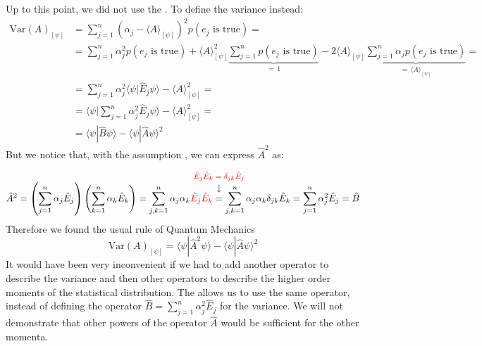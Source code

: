 \documentclass[../main.tex]{subfiles}
\begin{document}
Up to this point, we did not use the . To define the variance instead:
\begin{align*}
    \textrm{Var}(A)_{[\psi]}
    &=\sum_{j=1}^n\left(\alpha_j-\langle A \rangle_{[\psi]}\right)^2p(e_j \mbox{ is true})=\\
    &=\sum_{j=1}^n\alpha_j^2p(e_j \mbox{ is true})+\langle A \rangle_{[\psi]}^2\underbrace{\sum_{j=1}^n p(e_j \mbox{ is true})}_{=\,1}-2\langle A \rangle_{[\psi]}\underbrace{\sum_{j=1}^n\alpha_jp(e_j \mbox{ is true})}_{= \,\langle A \rangle_{[\psi]}}=\\
    &=\sum_{j=1}^n\alpha_j^2\langle \psi|\hat{E}_j \psi \rangle - \langle A \rangle_{[\psi]}^2=\\
    &=\langle \psi|\sum_{j=1}^n\alpha_j^2\hat{E}_j \psi \rangle - \langle A \rangle_{[\psi]}^2=\\
    &=\langle \psi|\hat{B} \psi \rangle - \langle \psi|\hat{A} \psi \rangle^2
\end{align*}
But we notice that, with the assumption , we can express $\hat{A}^2$ as:
\begin{align*}
    \hat{A}^2
    =\left(\sum_{j=1}^n \alpha_j \hat{E}_j \right)\left(\sum_{k=1}^n \alpha_k \hat{E}_k \right)
    =\sum_{j,k=1}^n\alpha_j\alpha_k {\color{red} \hat{E}_j\hat{E}_k}\overset{\mathclap{\tikz \node {↓} node [above=1ex] {\footnotesize \color{red} $\hat{E}_j\hat{E}_k=\delta_{jk}\hat{E}_j$};}}{=}
    \sum_{j,k=1}^n\alpha_j\alpha_k\delta_{jk}\hat{E}_k
    =\sum_{j=1}^n\alpha_j^2 \hat{E}_j
    =\hat{B}
\end{align*}
Therefore we found the usual rule of Quantum Mechanics
\[
\textrm{Var}(A)_{[\psi]}= \langle \psi|\hat{A}^2 \psi \rangle - \langle \psi|\hat{A} \psi \rangle^2
\]
It would have been very inconvenient if we had to add another operator to describe the variance and then other operators to describe the higher order moments of the statistical distribution. The  allows us to use the same operator, instead of defining the operator $\hat{B}=\sum_{j=1}^n\alpha_j^2\hat{E}_j$ for the variance. We will not demonstrate that other powers of the operator $\hat{A}$ would be sufficient for the other momenta.
\end{document}

